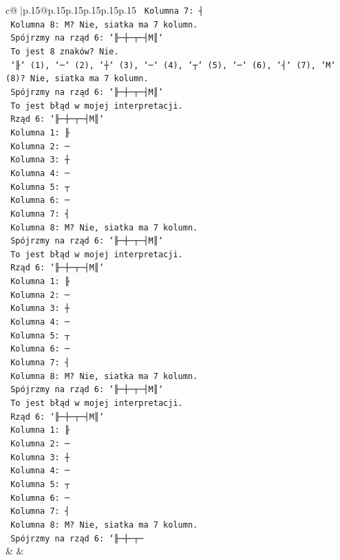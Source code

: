\documentclass{article}
\begin{document}
{\begin{supertabular}{c@{$\;$}|p{.15\linewidth}@{}p{.15\linewidth}p{.15\linewidth}p{.15\linewidth}p{.15\linewidth}p{.15\linewidth}}
{{{\texttt{    Kolumna 7: ┤} \\
\texttt{    Kolumna 8: M? Nie, siatka ma 7 kolumn.} \\
\texttt{    Spójrzmy na rząd 6: `╟─┼─┬─┤M║`} \\
\texttt{    To jest 8 znaków? Nie.} \\
\texttt{    `╟` (1), `─` (2), `┼` (3), `─` (4), `┬` (5), `─` (6), `┤` (7), `M` (8)? Nie, siatka ma 7 kolumn.} \\
\texttt{    Spójrzmy na rząd 6: `╟─┼─┬─┤M║`} \\
\texttt{    To jest błąd w mojej interpretacji.} \\
\texttt{    Rząd 6: `╟─┼─┬─┤M║`} \\
\texttt{    Kolumna 1: ╟} \\
\texttt{    Kolumna 2: ─} \\
\texttt{    Kolumna 3: ┼} \\
\texttt{    Kolumna 4: ─} \\
\texttt{    Kolumna 5: ┬} \\
\texttt{    Kolumna 6: ─} \\
\texttt{    Kolumna 7: ┤} \\
\texttt{    Kolumna 8: M? Nie, siatka ma 7 kolumn.} \\
\texttt{    Spójrzmy na rząd 6: `╟─┼─┬─┤M║`} \\
\texttt{    To jest błąd w mojej interpretacji.} \\
\texttt{    Rząd 6: `╟─┼─┬─┤M║`} \\
\texttt{    Kolumna 1: ╟} \\
\texttt{    Kolumna 2: ─} \\
\texttt{    Kolumna 3: ┼} \\
\texttt{    Kolumna 4: ─} \\
\texttt{    Kolumna 5: ┬} \\
\texttt{    Kolumna 6: ─} \\
\texttt{    Kolumna 7: ┤} \\
\texttt{    Kolumna 8: M? Nie, siatka ma 7 kolumn.} \\
\texttt{    Spójrzmy na rząd 6: `╟─┼─┬─┤M║`} \\
\texttt{    To jest błąd w mojej interpretacji.} \\
\texttt{    Rząd 6: `╟─┼─┬─┤M║`} \\
\texttt{    Kolumna 1: ╟} \\
\texttt{    Kolumna 2: ─} \\
\texttt{    Kolumna 3: ┼} \\
\texttt{    Kolumna 4: ─} \\
\texttt{    Kolumna 5: ┬} \\
\texttt{    Kolumna 6: ─} \\
\texttt{    Kolumna 7: ┤} \\
\texttt{    Kolumna 8: M? Nie, siatka ma 7 kolumn.} \\
\texttt{    Spójrzmy na rząd 6: `╟─┼─┬─} \\
            }
        }
    }
    & & \\ \\


\end{supertabular}}
\end{document}
